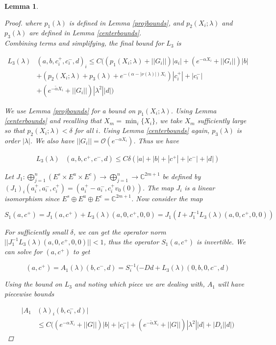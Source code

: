 \documentclass[12pt]{article}
\def\C{{\mathbb C}}
\newtheorem{lemma}{Lemma}
\begin{document}
\begin{lemma}
\begin{proof}
where $p_1(\lambda)$ is defined in Lemma \ref{projbounds}, and $p_2(X_i; \lambda)$ and $p_3(\lambda)$ are defined in Lemma \ref{centerbounds}.\\

Combining terms and simplifying, the final bound for $L_3$ is

\begin{align*}
L_3(\lambda)&(a, b, c_i^+, c_i^-, d)_i \leq C ( (p_1(X_i; \lambda) + ||G_i||)|a_i|
+ (e^{-\alpha X_i} + ||G_i||) |b| \\
&+ (p_2(X_i; \lambda) + p_3(\lambda) + e^{-(\alpha - |\nu(\lambda)|)X_i})|c_i^+| + |c_i^-| \\
&+ ( e^{-\tilde{\alpha} X_i} + ||G_i||) |\lambda^2| |d| )
\end{align*}

We use Lemma \ref{projbounds} for a bound on $p_1(X_i; \lambda)$. Using Lemma \ref{centerbounds} and recalling that $X_m = \min_i \{ X_i \}$, we take $X_m$ sufficiently large so that $p_2(X_i; \lambda) < \delta$ for all $i$. Using Lemma \ref{centerbounds} again, $p_3(\lambda)$ is order $|\lambda|$. We also have $||G_i|| = \mathcal{O}(e^{-\alpha X_i})$. Thus we have

\begin{align*}
L_3(\lambda)&(a, b, c^+, c^-, d)\leq C \delta (|a| + |b| + |c^+| + |c^-| + |d|)
\end{align*}

Let $J_1: \bigoplus_{j=1}^n (E^s \times E^u \times E^c) \rightarrow \bigoplus_{j=1}^n \rightarrow \C^{2m+1}$ be defined by $(J_1)_i(a_i^+, a_i^-, c_i^+) = (a_i^+ - a_i^-, c_i^+ v_0(0) )$. The map $J_i$ is a linear isomorphism since $E^s \oplus E^u \oplus E^c = \C^{2m + 1}$. Now consider the map

\[
S_1(a, c^+) = J_1 (a, c^+) + L_3(\lambda)(a, 0, c^+, 0, 0) = J_1( I + J_1^{-1} L_3(\lambda)(a, 0, c^+, 0, 0))
\]

For sufficiently small $\delta$, we can get the operator norm $||J_1^{-1} L_3(\lambda)(a, 0, c^+, 0, 0)|| < 1$, thus the operator $S_1(a, c^+)$ is invertible. We can solve for $(a, c^+)$ to get

\[
(a, c^+) = A_1(\lambda)(b, c^-, d) = S_i^{-1}(-D d + L_3(\lambda)(0, b, 0, c^-, d)
\]

Using the bound on $L_3$ and noting which piece we are dealing with, $A_1$ will have piecewise bounds

\begin{align*}
|A_1&(\lambda)_i(b, c_i^-, d)| \\
&\leq C \Big( (e^{-\alpha X_i} + ||G||) |b| + |c_i^-|
+ (e^{-\tilde{\alpha} X_i} + ||G||) |\lambda^2| |d| + |D_i||d| \Big)
\end{align*} 


\end{proof}
\end{lemma}
\end{document}
